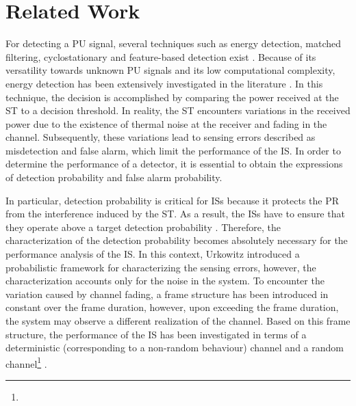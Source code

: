 \section{Related Work}



For detecting a PU signal, several techniques such as energy detection, matched filtering, cyclostationary and feature-based detection exist \cite{Sharma15, Axell12}. Because of its versatility towards unknown PU signals and its low computational complexity, energy detection has been extensively investigated in the literature \cite{Urkowitz, Kostylev02, Alouini03, Herath09, Mariani10}. In this technique, the decision is accomplished by comparing the power received at the ST to a decision threshold. In reality, the ST encounters variations in the received power due to the existence of thermal noise at the receiver and fading in the channel. Subsequently, these variations lead to sensing errors described as misdetection and false alarm, %
which limit the performance of the IS. In order to determine the performance of a detector, it is essential to obtain the expressions of detection probability and false alarm probability.

In particular, detection probability is critical for ISs because it protects the PR from the interference induced by the ST. As a result, the ISs have to ensure that they operate above a target detection probability \cite{peh07}. Therefore, the characterization of the detection probability becomes absolutely necessary for the performance analysis of the IS. In this context, Urkowitz \cite{Urkowitz} introduced a probabilistic framework for characterizing the sensing errors, however, the characterization accounts only for the noise in the system. To encounter the variation caused by channel fading, a frame structure has been introduced in \cite{Liang08}  constant over the frame duration, however, upon exceeding the frame duration, the system may observe a different realization of the channel. Based on this frame structure, the performance of the IS has been investigated in terms of a deterministic (corresponding to a non-random behaviour) channel \cite{Liang08, Sharma14, Pradhan15} and a random channel\footnote{} \cite{Kostylev02, Alouini03, Herath09}. %

